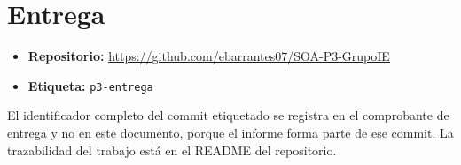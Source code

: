 \section*{Entrega}

\begin{itemize}
\item \textbf{Repositorio:} \url{https://github.com/ebarrantes07/SOA-P3-GrupoIE}
\item \textbf{Etiqueta:} \texttt{p3-entrega}
\end{itemize}

El identificador completo del commit etiquetado se registra en el comprobante
de entrega y no en este documento, porque el informe forma parte de ese commit.
La trazabilidad del trabajo está en el README del repositorio.
